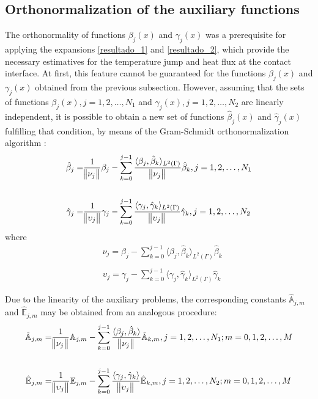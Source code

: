 \documentclass[12pt]{CHT-20}
\begin{document}
\subsection*{Orthonormalization of the auxiliary functions}
The orthonormality of functions $\beta_j(x)$ and $\gamma_j(x)$ was a prerequisite for applying the expansions \eqref{resultado_1} and \eqref{resultado_2}, which provide the necessary estimatives for the temperature jump and heat flux at the contact interface. At first, this feature cannot be guaranteed for the functions $\beta_j(x)$ and $\gamma_j(x)$ obtained from the previous subsection. However, assuming that the sets of functions $\beta_j(x), j=1,2,\dots, N_1$ and $\gamma_j(x), j=1,2,\dots, N_2$ are linearly independent, it is possible to obtain a new set of functions $\hat{\beta}_j(x)$ and $\hat{\gamma}_j(x)$ fulfilling that condition, by means of the Gram-Schmidt orthonormalization algorithm \citep{livro_axler}:
\begin{align}
\hat{\beta}_j = & \frac{1}{\norm{\nu_j}}\beta_j - \sum_{k=0}^{j-1} \frac{\langle \beta_j, \hat{\beta}_k \rangle_{L^2(\Gamma)}}{\norm{\nu_j}} \hat{\beta}_k, j=1,2,\dots, N_1 \label{termo_beta} \\ \nonumber \\
\hat{\gamma}_j = & \frac{1}{\norm{\upsilon_j}}\gamma_j - \sum_{k=0}^{j-1} \frac{\langle \gamma_j, \hat{\gamma}_k \rangle_{L^2(\Gamma)}}{\norm{\upsilon_j}} \hat{\gamma}_k, j=1,2,\dots, N_2 \label{termo_gamma}
\end{align}
where
\begin{align}
& \nu_j = \beta_j - \sum_{k = 0}^{j - 1} \langle \beta_j, \hat{\beta}_k\rangle_{L^2(\Gamma)}\hat{\beta}_k \\ \nonumber \\
& \upsilon_j = \gamma_j - \sum_{k = 0}^{j - 1} \langle \gamma_j, \hat{\gamma}_k\rangle_{L^2(\Gamma)}\hat{\gamma}_k
\end{align}

Due to the linearity of the auxiliary problems, the corresponding constants $\hat{\mathbb{A}}_{j,m}$ and $\hat{\mathbb{E}}_{j,m}$ may be obtained from an analogous procedure:
\begin{align}
\hat{\mathbb{A}}_{j,m} = & \frac{1}{\norm{\nu_j}} \mathbb{A}_{j,m} - \sum_{k=0}^{j-1} \frac{\langle \beta_j, \hat{\beta}_k \rangle}{\norm{\nu_j}} \hat{\mathbb{A}}_{k,m}, j=1,2,\dots, N_1; m=0,1,2,\ldots,M \label{expressao_relaciona_psi} \\ \nonumber \\
\hat{\mathbb{E}}_{j,m} = & \frac{1}{\norm{\upsilon_j}} \mathbb{E}_{j,m} - \sum_{k=0}^{j-1} \frac{\langle \gamma_j, \hat{\gamma}_k \rangle}{\norm{\upsilon_j}} \hat{\mathbb{E}}_{k,m}, j=1,2,\dots, N_2 ; m=0,1,2,\ldots,M \label{expressao_relaciona_zeta}
\end{align}
\end{document}
